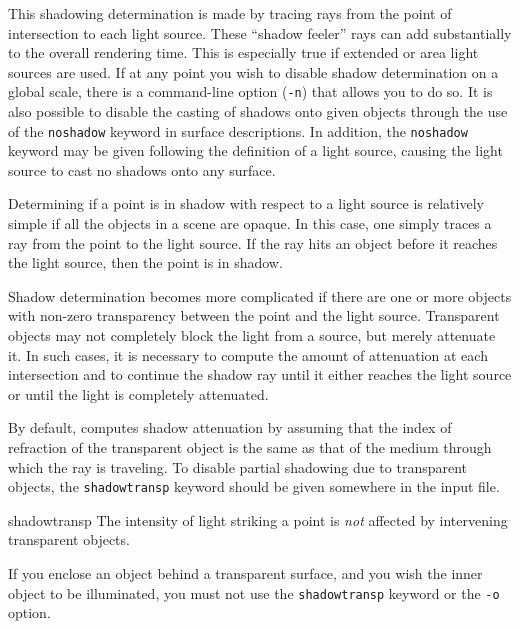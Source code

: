 This shadowing determination is made by tracing rays from the point
of intersection to each light source.  These ``shadow feeler'' rays
can add substantially to the overall rendering time.  This is especially
true if extended or area light sources are used.  If at any point you
wish to disable shadow determination on a global scale, there is
a command-line option ({\tt -n}) that allows you to do so.  It is also
possible
to disable the casting of shadows onto given objects through the use
of the {\tt noshadow} keyword in surface descriptions.  In addition,
the {\tt noshadow} keyword may be given following the definition
of a light source, causing the light source to cast no shadows onto
any surface.

Determining if a point is in shadow with respect to a light source
is relatively simple if all the objects in a scene are opaque.  In
this case, one simply traces a ray from the point to the light source.
If the ray hits an object before it reaches the light source, then
the point is in shadow.

Shadow determination
becomes more complicated if there are one or more objects with
non-zero transparency between the point and the light source.
Transparent objects may not completely block the light from a source,
but merely attenuate it. In such cases, it is necessary to compute the
amount of attenuation at each intersection and to continue
the shadow ray until it either reaches the light source or until
the light is completely attenuated.

By default, {\rayshade} computes shadow attenuation by assuming
that the index of refraction of the transparent object is the
same as that of the medium through which the ray is traveling.
To disable
partial shadowing due to transparent objects, the {\tt shadowtransp}
keyword should be given somewhere in the input file.

\begin{defkey}{shadowtransp}{}
	The intensity of light striking a point is {\em not} affected by
	intervening transparent objects.
\end{defkey}
If you enclose an object behind a transparent surface, and you wish
the inner object to be illuminated, you must not use the {\tt shadowtransp}
keyword or the {\tt -o} option.
